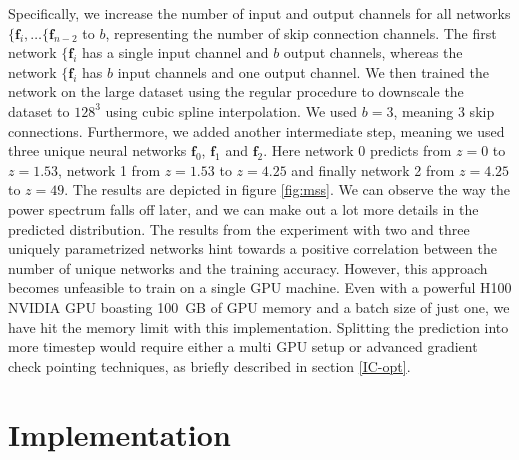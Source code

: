 \documentclass{article}
\begin{document}
Specifically, we increase the number of input and output channels for all networks $\{\mathbf{f}_i, \dots \{\mathbf{f}_{n-2}$ to $b$, representing the number of skip connection channels. The first network $\{\mathbf{f}_i$ has a single input channel and $b$ output channels, whereas the network $\{\mathbf{f}_i$ has $b$ input channels and one output channel. We then trained the network on the large dataset using the regular procedure to downscale the dataset to $128^3$ using cubic spline interpolation. We used $b=3$, meaning 3 skip connections. Furthermore, we added another intermediate step, meaning we used three unique neural networks $\mathbf{f}_0$, $\mathbf{f}_1$ and $\mathbf{f}_2$. Here network 0 predicts from $z=0$ to $z=1.53$, network 1 from $z=1.53$ to $z=4.25$ and finally network 2 from $z=4.25$ to $z=49$. The results are depicted in figure \ref{fig:mss}. We can observe the way the power spectrum falls off later, and we can make out a lot more details in the predicted distribution. The results from the experiment with two and three uniquely parametrized networks hint towards a positive correlation between the number of unique networks and the training accuracy. However, this approach becomes unfeasible to train on a single GPU machine. Even with a powerful H100 NVIDIA GPU boasting 100 GB of GPU memory and a batch size of just one, we have hit the memory limit with this implementation. Splitting the prediction into more timestep would require either a multi GPU setup or advanced gradient check pointing techniques, as briefly described in section \ref{IC-opt}. 



\newpage
\section{Implementation}
\label{impl}
\end{document}
